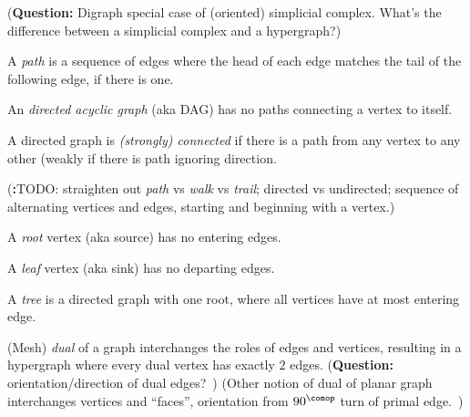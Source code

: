 \documentclass[11pt,openany]{book}
\let\oldfigure\figure%
\let\endoldfigure\endfigure%
\renewenvironment{figure}[1][htbp]%
  {\oldfigure[#1]\mdframed[backgroundcolor=GhostWhite,linecolor=GhostWhite]}
  {\endmdframed\endoldfigure}
\begin{document}
(\textbf{Question:} 
Digraph special case of (oriented) simplicial complex.
What's the difference between a simplicial complex 
and a hypergraph?)

A \textit{path} is a sequence of edges where the head of each
edge matches the tail of the following edge, if there is one.

An \textit{directed acyclic graph} (aka DAG) has no paths
connecting a vertex to itself.

A directed graph is \textit{(strongly) connected} if there is a path
from any vertex to any other (weakly if there is path
ignoring direction.

(\textbf:{TODO:} straighten out \textit{path} vs \textit{walk} vs
\textit{trail}; directed vs undirected; sequence of alternating
vertices and edges, starting and beginning with a vertex.)

A \textit{root} vertex (aka source) has no entering edges.

A \textit{leaf} vertex (aka sink) has no departing edges.

A \textit{tree} is a directed graph with one root, 
where all vertices have at most entering edge.

(Mesh) \textit{dual} of a graph interchanges the roles of edges 
and vertices, resulting in a hypergraph where every dual vertex
has exactly $2$ edges. 
(\textbf{Question:} orientation/direction 
of dual edges?~\cite{rusnak2012oriented})
(Other notion of dual of planar graph interchanges 
vertices and ``faces'',
orientation from $90^{\comop}$ 
turn of primal edge.~\cite{wiki_2020_dual_graph})

\begin{figure}
\begin{mdframed}[backgroundcolor=GhostWhite,linecolor=GhostWhite]
\centering
{}
\caption{A directed (acyclic) graph}
\label{fig:a_digraph}
\end{mdframed}
\end{figure}
\end{document}
